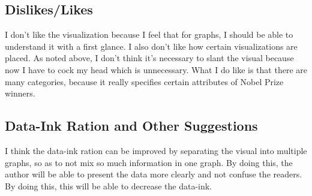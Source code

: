\documentclass[11pt]{article}
\begin{document}
\subsection{Dislikes/Likes}
I don't like the visualization because I feel that for graphs, I should be able to understand it with a first glance. I also don't like how certain visualizations are placed. As noted above, I don't think it's necessary to slant the visual because now I have to cock my head which is unnecessary. What I do like is that there are many categories, because it really specifies certain attributes of Nobel Prize winners.

\subsection{Data-Ink Ration and Other Suggestions}
I think the data-ink ration can be improved by separating the visual into multiple graphs, so as to not mix so much information in one graph. By doing this, the author will be able to present the data more clearly and not confuse the readers. By doing this, this will be able to decrease the data-ink.
\end{document}
